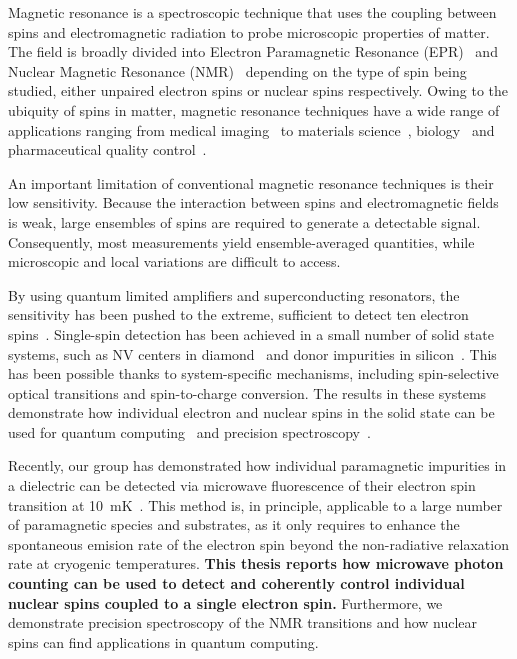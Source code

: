 
Magnetic resonance is a spectroscopic technique that uses the coupling between spins and electromagnetic radiation to probe microscopic properties of matter. The field is broadly divided into Electron Paramagnetic Resonance (EPR)~ and Nuclear Magnetic Resonance (NMR)~ depending on the type of spin being studied, either unpaired electron spins or nuclear spins respectively. Owing to the ubiquity of spins in matter, magnetic resonance techniques have a wide range of applications ranging from medical imaging~ to materials science~, biology~ and pharmaceutical quality control~.

An important limitation of conventional magnetic resonance techniques is their low sensitivity. Because the interaction between spins and electromagnetic fields is weak, large ensembles of spins are required to generate a detectable signal. Consequently, most measurements yield ensemble-averaged quantities, while microscopic and local variations are difficult to access. 

By using quantum limited amplifiers and superconducting resonators, the sensitivity has been pushed to the extreme, sufficient to detect ten electron spins~. Single-spin detection has been achieved in a small number of solid state systems, such as NV centers in diamond~ and donor impurities in silicon~.  This has been possible thanks to system-specific mechanisms, including spin-selective optical transitions and spin-to-charge conversion. The results in these systems demonstrate how individual electron and nuclear spins in the solid state can be used for quantum computing~ and precision spectroscopy~.

Recently, our group has demonstrated how individual paramagnetic impurities in a dielectric can be detected via microwave fluorescence of their electron spin transition at 10~mK~. This method is, in principle, applicable to a large number of paramagnetic species and substrates, as it only requires to enhance the spontaneous emision rate of the electron spin beyond the non-radiative relaxation rate at cryogenic temperatures. \textbf{This thesis reports how microwave photon counting can be used to detect and coherently control individual nuclear spins coupled to a single electron spin.} Furthermore, we demonstrate precision spectroscopy of the NMR transitions and how nuclear spins can find applications in quantum computing. 

